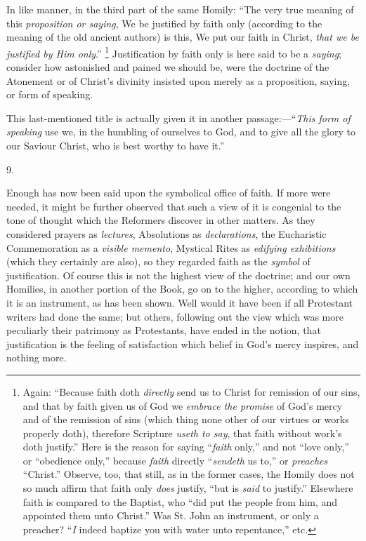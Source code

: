 In like manner, in the third part of the same Homily: ``The
very true meaning of this \emph{proposition or saying}, We be
justified by faith only (according to the meaning of the old ancient
authors) is this, We put our faith in Christ, \emph{that we be justified
by Him only}.'' \footnote{Again:
``Because faith doth \emph{directly} send us to Christ for
remission of our sins, and that by faith given us of God we \emph{embrace
the promise} of God's mercy and of the remission of sins (which
thing none other of our virtues or works properly doth), therefore
Scripture \emph{useth to say}, that faith without work's doth
justify.'' Here is the reason for saying ``\emph{faith}
only,'' and not ``love only,'' or ``obedience
only,'' because \emph{faith} directly ``\emph{sendeth} us
to,'' or \emph{preaches} ``Christ.'' Observe, too, that
still, as in the former cases, the Homily does not so much affirm that
faith only \emph{does} justify, ``but is \emph{said} to
justify.'' Elsewhere faith is compared to the Baptist, who
``did put the people from him, and appointed them unto
Christ.'' Was St. John an instrument, or only a preacher? ``\emph{I}
indeed baptize you with water unto repentance,'' etc.}
Justification by faith only is here said to be a \emph{saying};
consider how astonished and pained we should be, were the doctrine of
the Atonement or of Christ's divinity insisted upon merely as a
proposition, saying, or form of speaking.

This last-mentioned title is actually given it in another passage:—``\emph{This
form of speaking} use we, in the humbling of ourselves to God, and
to give all the glory to our Saviour Christ, who is best worthy to
have it.''

9.

Enough has now been said upon the symbolical office of faith. If
more were needed, it might be further observed that such a view of it
is congenial to the tone of thought which the Reformers discover in
other matters. As they considered prayers as \emph{lectures},
Absolutions as \emph{declarations}, the Eucharistic Commemoration as a
\emph{visible memento}, Mystical Rites as \emph{edifying exhibitions}
(which they certainly are also), so they regarded faith as the \emph{symbol}
of justification. Of course this is not the highest view of the
doctrine; and our own Homilies, in another portion of the Book, go on
to the higher, according to which it is an instrument, as has been
shown. Well would it have been if all Protestant writers had done the
same; but others, following out the view which was more peculiarly
their patrimony as Protestants, have ended in the notion, that
justification is the feeling of satisfaction which belief in God's
mercy inspires, and nothing more.

